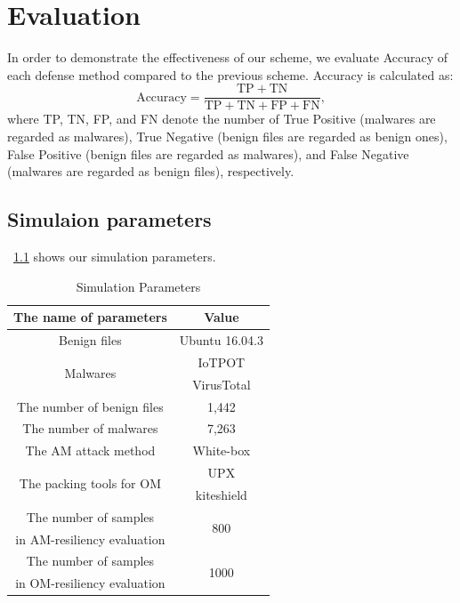 \chapter{Evaluation}\label{sec:evaluation} 
In order to demonstrate the effectiveness of our scheme, we evaluate Accuracy of each defense method compared to the previous scheme.
Accuracy is calculated as:
\begin{equation}
  \mathrm{Accuracy} = \frac{\mathrm{TP}+\mathrm{TN}}{\mathrm{TP} + \mathrm{TN} + \mathrm{FP} + \mathrm{FN}}, 
\end{equation}
where TP, TN, FP, and FN denote the number of True Positive (malwares are regarded as malwares), True Negative (benign files are regarded as benign ones), False Positive (benign files are regarded as malwares), and False Negative (malwares are regarded as benign files), respectively.  

\section{Simulaion parameters}
\tablename~\ref{tab:simulation_parameters} shows our simulation parameters.  
\begin{table}[p]
	\begin{center}
		\caption{Simulation Parameters}
		\label{tab:simulation_parameters} 
		\begin{tabular}{|c|c|} \hline
			The name of parameters & Value\\ \hline \hline
			Benign files & Ubuntu 16.04.3\cite{ubuntu}\\ \hline
			\multirow{2}{*}{\hfill Malwares  \hfill} & IoTPOT\cite{iotpot} \\ 
																							 & VirusTotal\cite{virustotal}\\ \hline
			The number of benign files  & 1,442 \\  \hline
			The number of malwares  &  7,263 \\ \hline
			The AM attack method & White-box \cite{yamafumi} \\ \hline
			\multirow{2}{*}{\hfill The packing tools for OM  \hfill} & UPX\cite{upx} \\ & kiteshield\cite{kiteshield} \\ \hline
			The number of samples  & \multirow{2}{*}{\hfill 800 \hfill} \\  
			in AM-resiliency evaluation & \\ \hline 
			The number of samples  & \multirow{2}{*}{\hfill 1000 \hfill} \\  
			in OM-resiliency evaluation & \\ \hline 
		\end{tabular}
	\end{center}
\end{table} 


